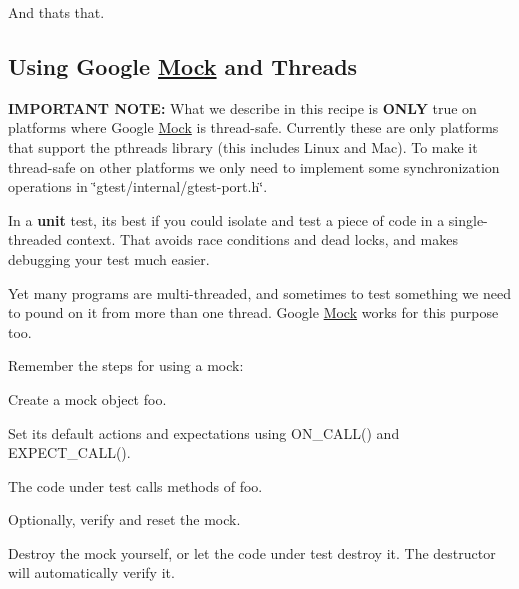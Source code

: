 And that\textquotesingle{}s that.

\subsection*{Using Google \mbox{\hyperlink{class_mock}{Mock}} and Threads}

{\bfseries{I\+M\+P\+O\+R\+T\+A\+NT N\+O\+TE\+:}} What we describe in this recipe is {\bfseries{O\+N\+LY}} true on platforms where Google \mbox{\hyperlink{class_mock}{Mock}} is thread-\/safe. Currently these are only platforms that support the pthreads library (this includes Linux and Mac). To make it thread-\/safe on other platforms we only need to implement some synchronization operations in {\ttfamily \char`\"{}gtest/internal/gtest-\/port.\+h\char`\"{}}.

In a {\bfseries{unit}} test, it\textquotesingle{}s best if you could isolate and test a piece of code in a single-\/threaded context. That avoids race conditions and dead locks, and makes debugging your test much easier.

Yet many programs are multi-\/threaded, and sometimes to test something we need to pound on it from more than one thread. Google \mbox{\hyperlink{class_mock}{Mock}} works for this purpose too.

Remember the steps for using a mock\+:


\begin{DoxyEnumerate}
\item Create a mock object {\ttfamily foo}.
\end{DoxyEnumerate}
\begin{DoxyEnumerate}
\item Set its default actions and expectations using {\ttfamily O\+N\+\_\+\+C\+A\+L\+L()} and {\ttfamily E\+X\+P\+E\+C\+T\+\_\+\+C\+A\+L\+L()}.
\end{DoxyEnumerate}
\begin{DoxyEnumerate}
\item The code under test calls methods of {\ttfamily foo}.
\end{DoxyEnumerate}
\begin{DoxyEnumerate}
\item Optionally, verify and reset the mock.
\end{DoxyEnumerate}
\begin{DoxyEnumerate}
\item Destroy the mock yourself, or let the code under test destroy it. The destructor will automatically verify it.
\end{DoxyEnumerate}

